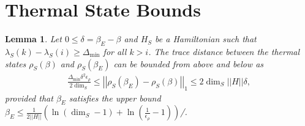 \documentclass{article}
\newtheorem{lemma}[theorem]{Lemma}
\newcommand{\parens}[1]{\left( #1 \right)}
\newcommand{\norm}[1]{\left| \left| #1 \right| \right|}
\begin{document}



\appendix



\section{Thermal State Bounds}


\begin{lemma} \label{lem:thermal_state_diff_bound}
    Let $0 \leq \delta = \beta_E - \beta$ and $H_S$ be a Hamiltonian such that $\lambda_S(k) - \lambda_S(i) \geq \Delta_{\min}$ for all $k > i$. The trace distance between the thermal states $\rho_S(\beta)$ and $\rho_S(\beta_E)$ can be bounded from above and below as
    \begin{align}
        \frac{\Delta_{\min} \delta^2 \epsilon_{\rho}}{2 \dim_S} \leq \norm{\rho_S(\beta_E) - \rho_S(\beta)}_1 \leq 2 \dim_S \norm{H} \delta,
    \end{align}
    provided that $\beta_E$ satisfies the upper bound $\beta_E \leq \frac{1}{2 \norm{H}} \parens{\ln (\dim_S - 1) + \ln \left( \frac{1}{\epsilon_{\rho}} - 1\right) }$/. 
\end{lemma}
\end{document}
